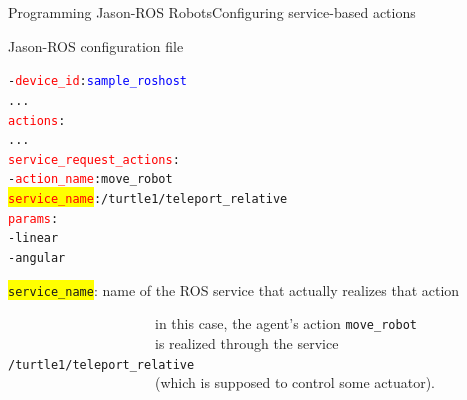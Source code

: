 \documentclass[compress]{beamer}
\newcommand{\yamlkey}[1]{\textcolor{red}{\texttt{#1}}}
\newcommand{\yamlvalue}[1]{\textcolor{blue}{\texttt{#1}}}
\begin{document}
\begin{frame}[fragile]{Programming Jason-ROS Robots}{Configuring service-based actions}{}


\footnotesize

 
\begin{block}{Jason-ROS configuration file}


\scriptsize
\begin{alltt}\scriptsize
- \yamlkey{device_id}: \yamlvalue{sample_roshost}
     ...
  \yamlkey{actions}:        
        ...
     \yamlkey{service_request_actions}:
        - \yamlkey{action_name}: move_robot
          \colorbox{yellow}{\yamlkey{service_name}}: /turtle1/teleport_relative
          \yamlkey{params}:
             - linear
             - angular
\end{alltt}
    
\end{block}  


 
 \colorbox{yellow}{\texttt{service\_name}}: name of the ROS service that actually realizes that action\\
 
 \vspace{-.5cm}
 
 \ \ \ \ \ \ \ \ \ \ \ \ \ \ \ \ \ \ \ \ \ {\tiny in this case, the agent's action \texttt{move\_robot}}\\ 
 
 \vspace{-.5cm}
 \ \ \ \ \ \ \ \ \ \ \ \ \ \ \ \ \ \ \ \ \ {\tiny is realized through the service \texttt{/turtle1/teleport\_relative}}\\ 
 
 \vspace{-.5cm}
 \ \ \ \ \ \ \ \ \ \ \ \ \ \ \ \ \ \ \ \ \ {\tiny (which is supposed to control some actuator).}
 

\scriptsize

\end{frame}
\end{document}
